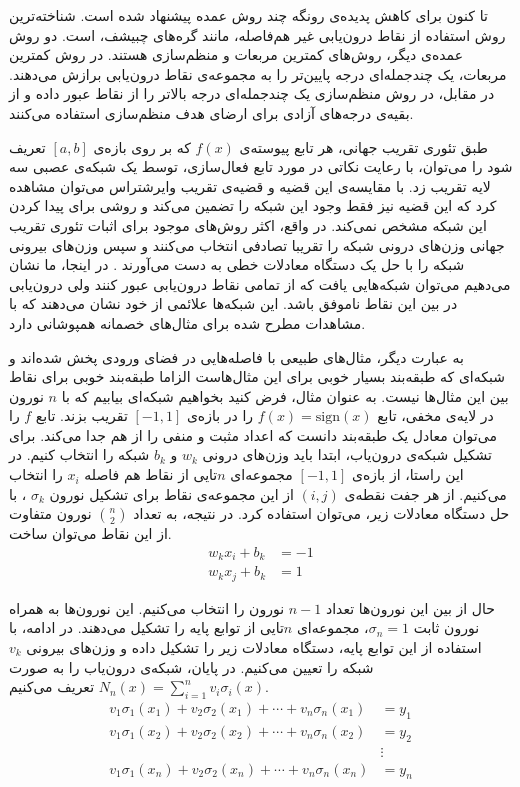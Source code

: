 \documentclass[12pt,onecolumn,a4paper]{article}
\begin{document}
تا کنون برای کاهش پدیده‌ی رونگه چند روش عمده پیشنهاد شده است. شناخته‌ترین روش استفاده از نقاط درون‌یابی غیر هم‌فاصله، مانند گره‌های چبیشف، است. دو روش عمده‌ی دیگر، روش‌های کمترین مربعات و منظم‌سازی هستند. در روش کمترین مربعات، یک چندجمله‌ای درجه پایین‌تر را به مجموعه‌ی نقاط درون‌یابی برازش می‌دهند. در مقابل، در روش منظم‌سازی یک چندجمله‌ای درجه بالاتر را از نقاط عبور داده و از بقیه‌ی درجه‌های آزادی برای ارضای هدف منظم‌سازی استفاده می‌کنند.

طبق تئوری تقریب جهانی، هر تابع پیوسته‌ی $f(x)$ که بر روی بازه‌ی $[a,b]$ تعریف شود را می‌توان، با رعایت نکاتی در مورد تابع فعال‌سازی، توسط یک شبکه‌ی عصبی سه لایه تقریب زد. با مقایسه‌ی این قضیه و قضیه‌ی تقریب وایرشتراس می‌توان مشاهده کرد که این قضیه نیز فقط وجود این شبکه را تضمین می‌کند و روشی برای پیدا کردن این شبکه مشخص نمی‌کند. در واقع، اکثر روش‌های موجود برای اثبات تئوری تقریب جهانی وزن‌های درونی شبکه را تقریبا تصادفی انتخاب می‌کنند و سپس وزن‌های بیرونی شبکه را با حل یک دستگاه معادلات خطی به دست می‌آورند
\cite{LLANAS2006283}
. در اینجا، ما نشان می‌دهیم می‌توان شبکه‌هایی یافت که از تمامی نقاط درون‌یابی عبور کنند ولی درون‌یابی در بین این نقاط ناموفق باشد. این شبکه‌ها علائمی از خود نشان می‌دهند که با مشاهدات مطرح شده برای مثال‌های خصمانه همپوشانی دارد.

به عبارت دیگر، مثال‌های طبیعی با فاصله‌هایی در فضای ورودی پخش شده‌اند و شبکه‌ای که طبقه‌بند بسیار خوبی برای این مثال‌هاست الزاما طبقه‌بند خوبی برای نقاط بین این مثال‌ها نیست. به عنوان مثال، فرض کنید بخواهیم شبکه‌ای بیابیم که با $n$ نورون در لایه‌ی مخفی، تابع 
$f(x)=\mathrm{sign}(x)$ 
را در بازه‌ی 
$[-1,1]$
تقریب بزند. تابع 
$f$ 
را می‌توان معادل یک طبقه‌بند دانست که اعداد مثبت و منفی را از هم جدا می‌کند. برای تشکیل شبکه‌ی درون‌یاب، ابتدا باید وزن‌های درونی $w_k$ و $b_k$ شبکه را انتخاب کنیم. در این راستا، از بازه‌ی 
$[-1,1]$ 
مجموعه‌ای $n$تایی از نقاط هم فاصله $x_i$ را انتخاب می‌کنیم. از هر جفت نقطه‌ی 
$(i,j)$
از این مجموعه‌ی نقاط برای تشکیل نورون
$\sigma_k$
، با حل دستگاه معادلات زیر، می‌توان استفاده کرد. در نتیجه، به تعداد 
${n\choose 2}$
نورون متفاوت از این نقاط می‌توان ساخت.
\begin{align*}
   w_kx_i+b_k&=-1\\
   w_kx_j+b_k&=1
\end{align*}

حال از بین این نورون‌ها تعداد $n-1$ نورون را انتخاب می‌کنیم. این نورون‌ها به همراه نورون ثابت $\sigma_n=1$، مجموعه‌ای $n$تایی از توابع پایه را تشکیل می‌دهند. در ادامه، با استفاده از این توابع پایه، دستگاه معادلات زیر را تشکیل داده و وزن‌های بیرونی $v_k$ شبکه را تعیین می‌کنیم. در پایان، شبکه‌ی درون‌یاب را به صورت $N_n(x)=\sum_{i=1}^nv_i\sigma_i(x)$ تعریف می‌کنیم.
\begin{align*}
v_1\sigma_1(x_1)+v_2\sigma_2(x_1)+\cdots+v_n\sigma_n(x_1)&=y_1\\
v_1\sigma_1(x_2)+v_2\sigma_2(x_2)+\cdots+v_n\sigma_n(x_2)&=y_2\\
&\vdots\\
v_1\sigma_1(x_n)+v_2\sigma_2(x_n)+\cdots+v_n\sigma_n(x_n)&=y_n
\end{align*}
\end{document}

